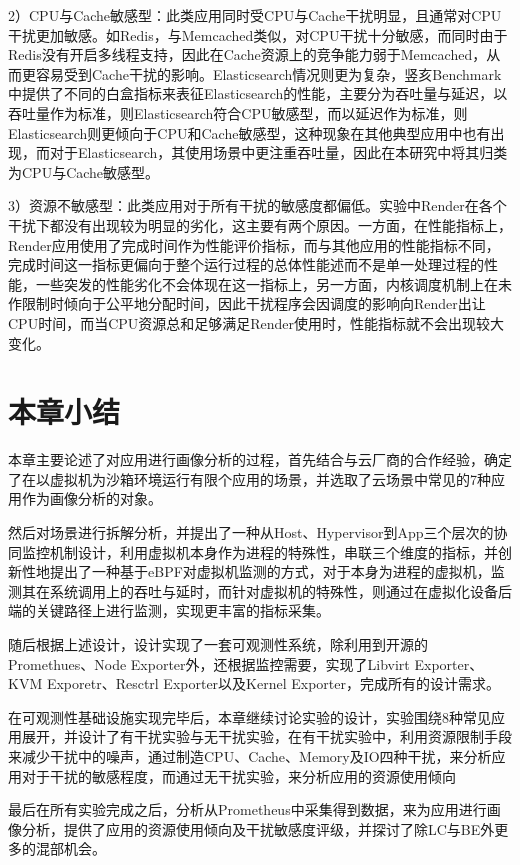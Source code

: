 2）CPU与Cache敏感型：此类应用同时受CPU与Cache干扰明显，且通常对CPU干扰更加敏感。如Redis，与Memcached类似，对CPU干扰十分敏感，而同时由于Redis没有开启多线程支持，因此在Cache资源上的竞争能力弱于Memcached，从而更容易受到Cache干扰的影响。Elasticsearch情况则更为复杂，竖亥Benchmark中提供了不同的白盒指标来表征Elasticsearch的性能，主要分为吞吐量与延迟，以吞吐量作为标准，则Elasticsearch符合CPU敏感型，而以延迟作为标准，则Elasticsearch则更倾向于CPU和Cache敏感型，这种现象在其他典型应用中也有出现，而对于Elasticsearch，其使用场景中更注重吞吐量，因此在本研究中将其归类为CPU与Cache敏感型。

3）资源不敏感型：此类应用对于所有干扰的敏感度都偏低。实验中Render在各个干扰下都没有出现较为明显的劣化，这主要有两个原因。一方面，在性能指标上，Render应用使用了完成时间作为性能评价指标，而与其他应用的性能指标不同，完成时间这一指标更偏向于整个运行过程的总体性能述而不是单一处理过程的性能，一些突发的性能劣化不会体现在这一指标上，另一方面，内核调度机制上在未作限制时倾向于公平地分配时间，因此干扰程序会因调度的影响向Render出让CPU时间，而当CPU资源总和足够满足Render使用时，性能指标就不会出现较大变化。

\section{本章小结}

本章主要论述了对应用进行画像分析的过程，首先结合与云厂商的合作经验，确定了在以虚拟机为沙箱环境运行有限个应用的场景，并选取了云场景中常见的7种应用作为画像分析的对象。

然后对场景进行拆解分析，并提出了一种从Host、Hypervisor到App三个层次的协同监控机制设计，利用虚拟机本身作为进程的特殊性，串联三个维度的指标，并创新性地提出了一种基于eBPF对虚拟机监测的方式，对于本身为进程的虚拟机，监测其在系统调用上的吞吐与延时，而针对虚拟机的特殊性，则通过在虚拟化设备后端的关键路径上进行监测，实现更丰富的指标采集。

随后根据上述设计，设计实现了一套可观测性系统，除利用到开源的Promethues、Node Exporter外，还根据监控需要，实现了Libvirt Exporter、KVM Exporetr、Resctrl Exporter以及Kernel Exporter，完成所有的设计需求。

在可观测性基础设施实现完毕后，本章继续讨论实验的设计，实验围绕8种常见应用展开，并设计了有干扰实验与无干扰实验，在有干扰实验中，利用资源限制手段来减少干扰中的噪声，通过制造CPU、Cache、Memory及IO四种干扰，来分析应用对于干扰的敏感程度，而通过无干扰实验，来分析应用的资源使用倾向

最后在所有实验完成之后，分析从Prometheus中采集得到数据，来为应用进行画像分析，提供了应用的资源使用倾向及干扰敏感度评级，并探讨了除LC与BE外更多的混部机会。